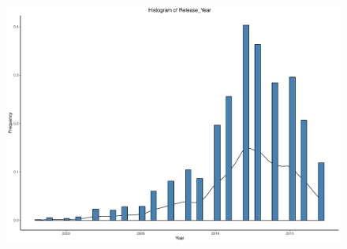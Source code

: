 \documentclass[a4paper]{article}
\begin{document}
\begin{figure}[H]
    \centering
    \includegraphics[keepaspectratio, width=1\textwidth, height=1\textheight]{Visualization/Hist/release_year_dis.pdf}
\end{figure}
\end{document}
